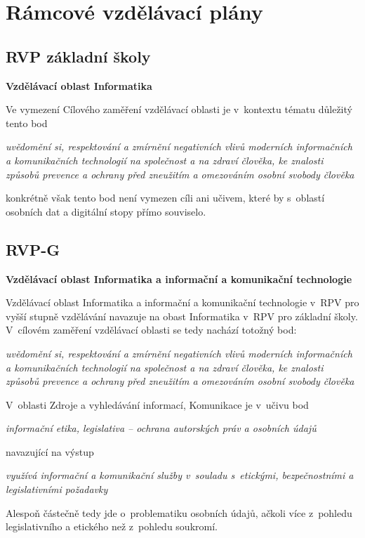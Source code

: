 \section{Rámcové vzdělávací plány}

\subsection{RVP základní školy}

\textbf{Vzdělávací oblast Informatika}

Ve vymezení Cílového zaměření vzdělávací oblasti je v~kontextu tématu důležitý tento bod

\textit{uvědomění si, respektování a zmírnění negativních vlivů moderních informačních a komunikačních technologií na společnost a na zdraví člověka, ke znalosti způsobů prevence a ochrany před zneužitím a omezováním osobní svobody člověka}

konkrétně však tento bod není vymezen cíli ani učivem, které by s~oblastí osobních dat a digitální stopy přímo souviselo.

\subsection{RVP-G}

\textbf{Vzdělávací oblast Informatika a informační a komunikační technologie}

Vzdělávací oblast Informatika a informační a komunikační technologie v~RPV pro vyšší stupně vzdělávání navazuje na obast Informatika v~RPV pro základní školy. V~cílovém zaměření vzdělávací oblasti se tedy nachází totožný bod:

\textit{uvědomění si, respektování a zmírnění negativních vlivů moderních informačních a komunikačních technologií na společnost a na zdraví člověka, ke znalosti způsobů prevence a ochrany před zneužitím a omezováním osobní svobody člověka}

V~oblasti Zdroje a vyhledávání informací, Komunikace je v~učivu bod

\textit{informační etika, legislativa – ochrana autorských práv a osobních údajů}

navazující na výstup

\textit{využívá informační a komunikační služby v~souladu s~etickými, bezpečnostními a legislativními požadavky}

Alespoň částečně tedy jde o~problematiku osobních údajů, ačkoli více z~pohledu legislativního a etického než z~pohledu soukromí.

